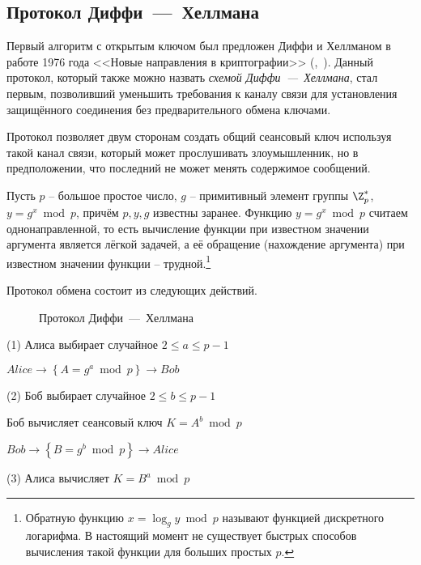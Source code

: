\subsection{Протокол Диффи~---~Хеллмана}\label{section-protocols-diffie-hellman}

Первый алгоритм с открытым ключом был предложен Диффи и Хеллманом в работе 1976 года <<Новые направления в криптографии>> (,~\cite{Diffie:Hellman:1976}). Данный протокол, который также можно назвать \emph{схемой Диффи~---~Хеллмана}, стал первым, позволивший уменьшить требования к каналу связи для установления защищённого соединения без предварительного обмена ключами.

Протокол позволяет двум сторонам создать общий сеансовый ключ используя такой канал связи, который может прослушивать злоумышленник, но в предположении, что последний не может менять содержимое сообщений.

Пусть $p$ -- большое простое число, $g$ -- примитивный элемент группы $\Z_p^*$, ~ $y = g^x \bmod p$, причём $p, y, g$ известны заранее. Функцию $y=g^{x} \bmod p$ считаем однонаправленной, то есть вычисление функции при известном значении аргумента является лёгкой задачей, а её обращение (нахождение аргумента) при известном значении функции -- трудной.\footnote{Обратную функцию $x = \log_g y \bmod p$ называют функцией дискретного логарифма. В настоящий момент не существует быстрых способов вычисления такой функции для больших простых $p$.}

Протокол обмена состоит из следующих действий.

\begin{figure}
	\centering
	\begin{sequencediagram}
		
	\end{sequencediagram}
	\caption{Протокол Диффи~---~Хеллмана\label{fig:key_distribution-diffie-hellman}}
\end{figure}

\begin{protocol}
    \item[(1)] Алиса выбирает случайное $2 \leq a \leq p - 1$
    \item[{}] $Alice \to \left\{ A = g ^ a \bmod p \right\} \to Bob$
    \item[(2)] Боб выбирает случайное $2 \leq b \leq p-1$
    \item[{}] Боб вычисляет сеансовый ключ $K = A ^ b \bmod p$
    \item[{}] $Bob \to \left\{ B = g ^ b \bmod p \right\} \to Alice$
    \item[(3)] Алиса вычисляет $K = B ^ a \bmod p$
\end{protocol}

